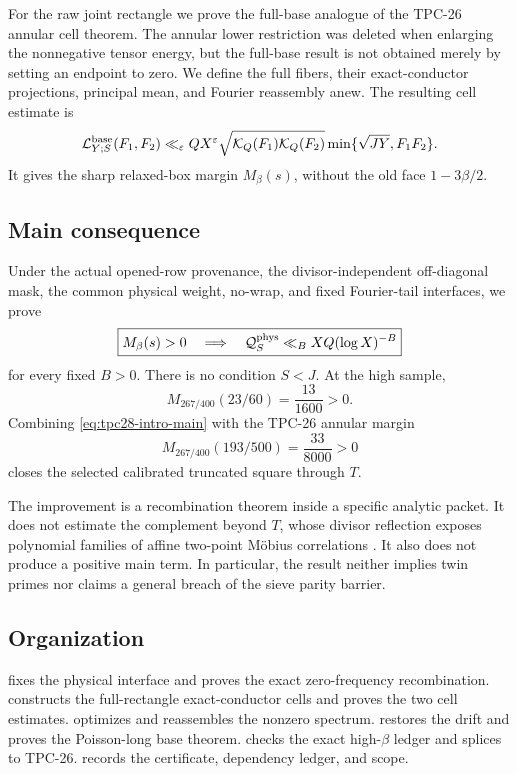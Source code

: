 For the raw joint rectangle we prove the full-base analogue of the
TPC-26 annular cell theorem.  The annular lower restriction was deleted
when enlarging the nonnegative tensor energy, but the full-base result
is not obtained merely by setting an endpoint to zero.  We define the
full fibers, their exact-conductor projections, principal mean, and
Fourier reassembly anew.  The resulting cell estimate is
\begin{equation}
 \mathcal L^{\rm base}_{Y;S}(F_1,F_2)
 \ll_\varepsilon QX^\varepsilon
 \sqrt{\mathcal K_Q(F_1)\mathcal K_Q(F_2)}
 \min\{\sqrt{JY},F_1F_2\}.
 \label{eq:tpc28-intro-cell-bound}
\end{equation}
It gives the sharp relaxed-box margin $M_\beta(s)$, without the old
face $1-3\beta/2$.

\subsection{Main consequence}

Under the actual opened-row provenance, the divisor-independent
off-diagonal mask, the common physical weight, no-wrap, and fixed
Fourier-tail interfaces, we prove
\begin{equation}
 \boxed{
 M_\beta(s)>0
 \quad\Longrightarrow\quad
 \mathcal Q_S^{\rm phys}
 \ll_B XQ(\log X)^{-B}}
 \label{eq:tpc28-intro-main}
\end{equation}
for every fixed $B>0$.  There is no condition $S<J$.  At the high
sample,
\begin{equation}
 M_{267/400}(23/60)=\frac{13}{1600}>0.
 \label{eq:tpc28-intro-base-margin}
\end{equation}
Combining \eqref{eq:tpc28-intro-main} with the TPC-26 annular margin
\begin{equation}
 M_{267/400}(193/500)=\frac{33}{8000}>0
 \label{eq:tpc28-intro-upper-margin}
\end{equation}
closes the selected calibrated truncated square through $T$.

The improvement is a recombination theorem inside a specific analytic
packet.  It does not estimate the complement beyond $T$, whose
divisor reflection exposes polynomial families of affine two-point
M\"obius correlations \citep{WangTPC23,WangTPC26}.  It also does not
produce a positive main term.  In particular, the result neither
implies twin primes nor claims a general breach of the sieve parity
barrier.

\subsection{Organization}

 fixes the physical interface and proves
the exact zero-frequency recombination.  
constructs the full-rectangle exact-conductor cells and proves the two
cell estimates.   optimizes and reassembles the
nonzero spectrum.   restores the drift and
proves the Poisson-long base theorem.  
checks the exact high-$\beta$ ledger and splices to TPC-26.
 records the certificate, dependency
ledger, and scope.

